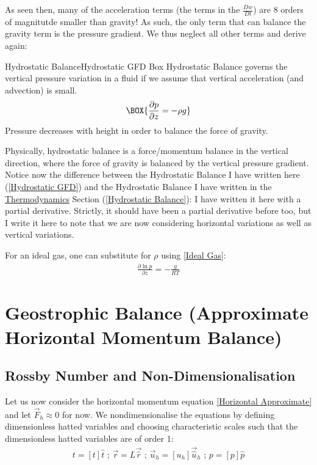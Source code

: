 As seen then, many of the acceleration terms (the terms in the $\frac{Dw}{Dt}$) are 8 orders of magnitutde smaller than gravity! As such, the only term that can balance the gravity term is the pressure gradient. We thus neglect all other terms and derive again:

\begin{fact}{Hydrostatic Balance}{Hydrostatic GFD Box}\label{Hydrostatic GFD Box}
Hydrostatic Balance governs the vertical pressure variation in a fluid if we assume that vertical acceleration (and advection) is small.
    \begin{equation}\label{Hydrostatic GFD}
    \BOX{
        \frac{\partial p}{\partial z}=-\rho g
    }
    \end{equation}
Pressure decreases with height in order to balance the force of gravity.
\end{fact}

Physically, hydrostatic balance is a force/momentum balance in the vertical direction, where the force of gravity is balanced by the vertical pressure gradient. Notice now the difference between the Hydrostatic Balance I have written here (\ref{Hydrostatic GFD}) and the Hydrostatic Balance I have written in the \hyperref[Thermodynamics]{Thermodynamics} Section (\ref{Hydrostatic Balance}): I have written it here with a partial derivative. Strictly, it should have been a partial derivative before too, but I write it here to note that we are now considering horizontal variations as well as vertical variations.

For an ideal gas, one can substitute for $\rho$ using \ref{Ideal Gas}:
\begin{align}\label{Hydrostatic Ideal Gas}
    \boxed{\frac{\partial \ln p}{\partial z}=-\frac{g}{RT}}
\end{align}

\section{Geostrophic Balance (Approximate Horizontal Momentum Balance)}\label{App Horiz Bal}

\subsection{Rossby Number and Non-Dimensionalisation}

Let us now consider the horizontal momentum equation \ref{Horizontal Approximate} and let $\vec{F}_h\approx 0$ for now. We nondimensionalise the equations by defining dimensionless hatted variables and choosing characteristic scales such that the dimensionless hatted variables are of order 1:
\begin{align*}
    t=[t]\hat{t}\text{   ;   }
    \vec{r}=L\vec{\hat{r}}\text{   ;   }
    \vec{u}_h=[u_h]\vec{\hat{u}}_h\text{   ;   }
    p=[p]\hat{p}
\end{align*}


